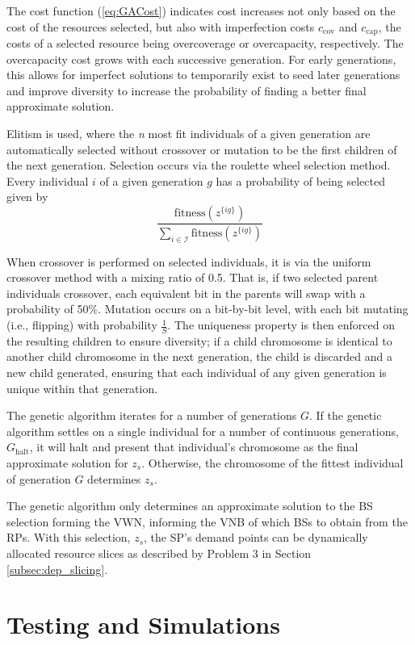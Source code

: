 \documentclass[12pt,dvips]{report}
\begin{document}
The cost function (\ref{eq:GACost}) indicates cost increases not only based on the cost of the resources selected, but also with imperfection costs $c_\text{cov}$ and $c_\text{cap}$, the costs of a selected resource being overcoverage or overcapacity, respectively.  The overcapacity cost grows with each successive generation.  For early generations, this allows for imperfect solutions to temporarily exist to seed later generations and improve diversity to increase the probability of finding a better final approximate solution.

Elitism is used, where the \textit{n} most fit individuals of a given generation are automatically selected without crossover or mutation to be the first children of the next generation.  Selection occurs via the roulette wheel selection method.  Every individual $i$ of a given generation $g$ has a probability of being selected given by
\[
\frac{\text{fitness}\left( z^{\{ig\}} \right)}{\sum_{i \in \mathcal{I}} \text{fitness}\left( z^{\{ig\}} \right)}
\]

When crossover is performed on selected individuals, it is via the uniform crossover method with a mixing ratio of 0.5.  That is, if two selected parent individuals crossover, each equivalent bit in the parents will swap with a probability of 50\%.  Mutation occurs on a bit-by-bit level, with each bit mutating (i.e., flipping) with probability $\frac{1}{S}$.  The uniqueness property is then enforced on the resulting children to ensure diversity; if a child chromosome is identical to another child chromosome in the next generation, the child is discarded and a new child generated, ensuring that each individual of any given generation is unique within that generation.

The genetic algorithm iterates for a number of generations $G$.  If the genetic algorithm settles on a single individual for a number of continuous generations, $G_\text{halt}$, it will halt and present that individual's chromosome as the final approximate solution for $z_s$.  Otherwise, the chromosome of the fittest individual of generation $G$ determines $z_s$.

The genetic algorithm only determines an approximate solution to the BS selection forming the VWN, informing the VNB of which BSs to obtain from the RPs.  With this selection, $z_s$, the SP's demand points can be dynamically allocated resource slices as described by Problem 3 in Section \ref{subsec:dep_slicing}.

\pagebreak
\chapter{Testing and Simulations} \label{ch:testsim}
\end{document}
